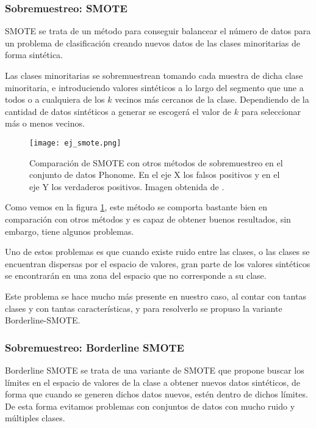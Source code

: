 \subsubsection{Sobremuestreo: SMOTE}

SMOTE se trata de un método para conseguir balancear el número de datos para un problema de clasificación creando nuevos datos de las clases minoritarias de forma sintética.

Las clases minoritarias se sobremuestrean tomando cada muestra de dicha clase minoritaria, e introduciendo valores sintéticos a lo largo del segmento que une a todos o a cualquiera de los $k$ vecinos más cercanos de la clase. Dependiendo de la cantidad de datos sintéticos a generar se escogerá el valor de $k$ para seleccionar más o menos vecinos.


\begin{figure}[H]
	\centering
	\texttt{[image: ej\_smote.png]}
	\caption{Comparación de SMOTE con otros métodos de sobremuestreo en el conjunto de datos Phonome. En el eje X los falsos positivos y en el eje Y los verdaderos positivos. Imagen obtenida de \cite{SMOTE}.}
	\label{fig:comparacionSMOTE}
\end{figure}

Como vemos en la figura \ref{fig:comparacionSMOTE}, este método se comporta bastante bien en comparación con otros métodos y es capaz de obtener buenos resultados, sin embargo, tiene algunos problemas.

Uno de estos problemas es que cuando existe ruido entre las clases, o las clases se encuentran dispersas por el espacio de valores, gran parte de los valores sintéticos se encontrarán en una zona del espacio que no corresponde a su clase.

Este problema se hace mucho más presente en nuestro caso, al contar con tantas clases y con tantas características, y para resolverlo se propuso la variante Borderline-SMOTE.

\subsubsection{Sobremuestreo: Borderline SMOTE}


Borderline SMOTE \cite{BL-SMOTE} se trata de una variante de SMOTE que propone buscar los límites en el espacio de valores de la clase a obtener nuevos datos sintéticos, de forma que cuando se generen dichos datos nuevos, estén dentro de dichos límites. De esta forma evitamos problemas con conjuntos de datos con mucho ruido y múltiples clases.

